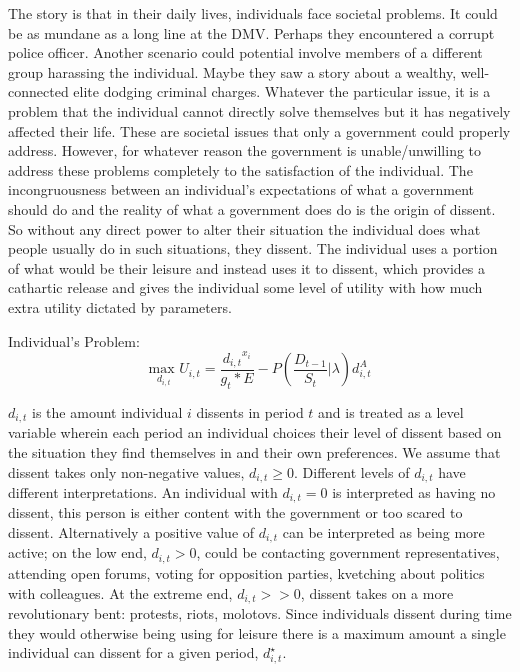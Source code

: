 \documentclass[12pt]{article}
\begin{document}
\begin{spacing}{1.5}
The story is that in their daily lives, individuals face societal problems. It could be as mundane as a long line at the DMV. Perhaps they encountered a corrupt police officer. Another scenario could potential involve members of a different group harassing the individual. Maybe they saw a story about a wealthy, well-connected elite dodging criminal charges. Whatever the particular issue, it is a problem that the individual cannot directly solve themselves but it has negatively affected their life. These are societal issues that only a government could properly address. However, for whatever reason the government is unable/unwilling to address these problems completely to the satisfaction of the individual. The incongruousness between an individual's expectations of what a government should do and the reality of what a government does do is the origin of dissent. So without any direct power to alter their situation the individual does what people usually do in such situations, they dissent. The individual uses a portion of what would be their leisure and instead uses it to dissent, which provides a cathartic release and gives the individual some level of utility with how much extra utility dictated by parameters. 

\vspace{.5 em}
\noindent Individual's Problem:
\begin{equation}
{\underset{d_{i,t}}{\text{max }}}  U_{i,t}= \frac{{d_{i,t}}^{{x}_i}}{g_t * E} - P \left(\frac{D_{t-1}}{S_t}\Bigg|\lambda \right)d_{i,t}^A
\end{equation}

$ d_{i,t} $ is the amount individual $i$ dissents in period $t$ and is treated as a level variable wherein each period an individual choices their level of dissent based on the situation they find themselves in and their own preferences. We assume that dissent takes only non-negative values, $d_{i,t}\geq0$. Different levels of $d_{i,t}$ have different interpretations. An individual with $d_{i,t}=0$ is interpreted as having no dissent, this person is either content with the government or too scared to dissent. Alternatively a positive value of $d_{i,t}$ can be interpreted as being more active; on the low end, $d_{i,t}>0$, could be contacting government representatives, attending open forums, voting for opposition parties, kvetching about politics with colleagues. At the extreme end, $d_{i,t}>>0$, dissent takes on a more revolutionary bent: protests, riots, molotovs. Since individuals dissent during time they would otherwise being using for leisure there is a maximum amount a single individual can dissent for a given period, $d_{i,t}^\star$.  


\end{spacing}
\end{document}
